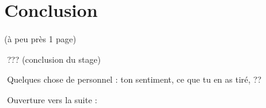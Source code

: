 \section{Conclusion}

(à peu près 1 page)

­ ??? (conclusion du stage)

­ Quelques chose de personnel : ton sentiment, ce que tu en as tiré, ??

­ Ouverture vers la suite :
